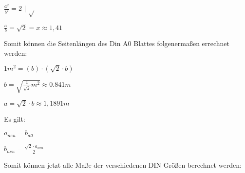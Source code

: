\documentclass[../main.tex]{subfiles}
\begin{document}
\begin{enumerate}
\begin{enumerate}
		            \begin{math}
			            \frac{a^2}{b^2} = 2
		            \end{math}
		            \(|\)
		            \begin{math}
			            \sqrt{}
		            \end{math}

		            \begin{math}
			            \frac{a}{b}
			            = \sqrt{2}
			            = x
			            \approx 1,41
		            \end{math}

		            Somit können die Seitenlängen des Din A0 Blattes folgenermaßen
		            errechnet werden:

		            \begin{math}
			            1 m^2
			            = (b) \cdot (\sqrt{2} \cdot b)
		            \end{math}

		            \begin{math}
			            b = \sqrt{
				            \frac{1}{\sqrt{2}} m^2
			            }
			            \approx 0.841 m
		            \end{math}

		            \begin{math}
			            a = \sqrt{2} \cdot b
			            \approx 1,1891 m
		            \end{math}

		            Es gilt:

		            \begin{math}
			            a_{neu} = b_{alt}
		            \end{math}

		            \begin{math}
			            b_{neu} = \frac{ \sqrt{2} \cdot a_{neu}}{ 2 }
		            \end{math}

		            Somit können jetzt alle Maße der verschiedenen DIN Größen berechnet werden:


\end{enumerate}
\end{enumerate}
\end{document}
